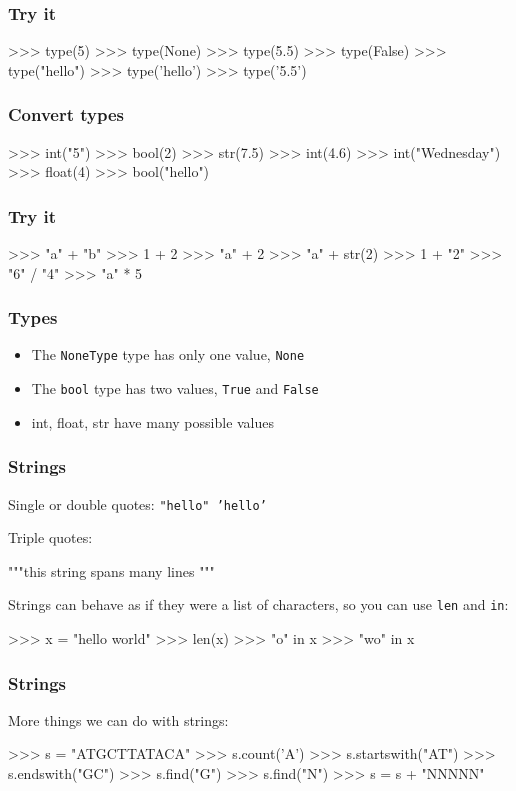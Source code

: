\documentclass{beamer}
\begin{document}
\begin{frame}[fragile]
\frametitle{Try it}
\begin{code}
>>> type(5)
>>> type(None)
>>> type(5.5)
>>> type(False)
>>> type("hello")
>>> type('hello')
>>> type('5.5')
\end{code}
\end{frame}

\begin{frame}[fragile]
\frametitle{Convert types}
\begin{code}
>>> int("5")
>>> bool(2)
>>> str(7.5)
>>> int(4.6)
>>> int("Wednesday")
>>> float(4)
>>> bool("hello")
\end{code}
\end{frame}


\begin{frame}[fragile]
\frametitle{Try it}
\begin{code}
>>> "a" + "b"
>>> 1 + 2
>>> "a" + 2
>>> "a" + str(2)
>>> 1 + "2"
>>> "6" / "4"
>>> "a" * 5
\end{code}
\end{frame}

\begin{frame}
\frametitle{Types}
\begin{itemize}
\item The {\tt NoneType} type has only one value, {\tt None}
\item The {\tt bool} type has two values, {\tt True} and {\tt False}
\item int, float, str have many possible values
\end{itemize}
\end{frame}

\begin{frame}[fragile]
\frametitle{Strings}
Single or double quotes: {\tt "hello" 'hello'}

Triple quotes:
\begin{code}
"""this string
spans many
lines
"""
\end{code}

Strings can behave as if they were a list of characters, so
you can use {\tt len} and {\tt in}: 
\begin{code}
>>> x = "hello world"
>>> len(x)
>>> "o" in x
>>> "wo" in x
\end{code}
\end{frame}


\begin{frame}[fragile]
\frametitle{Strings}

More things we can do with strings:
\begin{code}
>>> s = "ATGCTTATACA"
>>> s.count('A')
>>> s.startswith("AT")
>>> s.endswith("GC")
>>> s.find("G")
>>> s.find("N")
>>> s = s + "NNNNN"
\end{code}
\end{frame}
\end{document}

